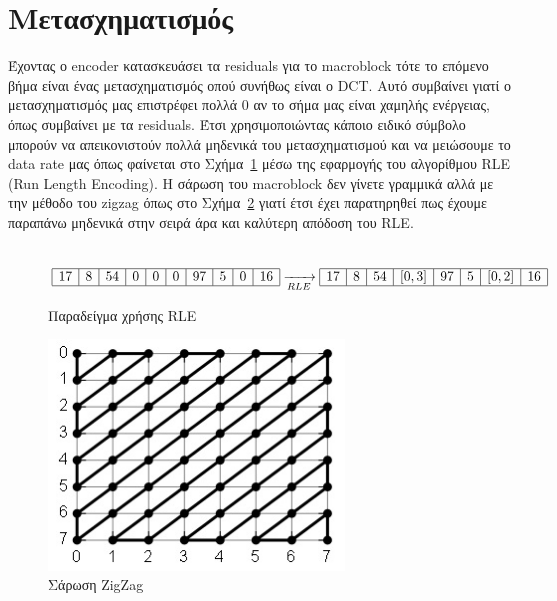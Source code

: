 \newpage

\section{Μετασχηματισμός}
\label{section:sect24}

\indent Έχοντας ο encoder κατασκευάσει τα residuals για το macroblock τότε το επόμενο βήμα είναι ένας μετασχηματισμός οπού συνήθως είναι ο DCT. Αυτό συμβαίνει γιατί ο μετασχηματισμός μας επιστρέφει πολλά 0 αν το σήμα μας είναι χαμηλής ενέργειας, όπως συμβαίνει με τα residuals. Έτσι χρησιμοποιώντας κάποιο ειδικό σύμβολο μπορούν να απεικονιστούν πολλά μηδενικά του μετασχηματισμού και να μειώσουμε το data rate μας όπως φαίνεται στο Σχήμα~\ref{eq:rle} μέσω της εφαρμογής του αλγορίθμου RLE (Run Length Encoding). Η σάρωση του macroblock δεν γίνετε γραμμικά αλλά με την μέθοδο του zigzag όπως στο Σχήμα~\ref{fig:zigzag} γιατί έτσι έχει παρατηρηθεί πως έχουμε παραπάνω μηδενικά στην σειρά άρα και καλύτερη απόδοση του RLE.
\\
\\
\begin{figure}[H]
\centering
$
\begin{array}{| c | c | c | c | c | c | c | c | c | c |}
    \hline 17 & 8 & 54 & 0 & 0 & 0 & 97 & 5 & 0 & 16 \\ \hline
\end{array}
\xrightarrow[RLE]{}
\begin{array}{| c | c | c | c | c | c | c | c |}
    \hline 17 & 8 & 54 & [0,3]  & 97 & 5 & [0,2] & 16 \\ \hline
\end{array}
$
\caption{Παραδείγμα χρήσης RLE}
\label{eq:rle}
\end{figure}

\begin{figure}[H]
  \centering
  \includegraphics[width=0.7\textwidth]{chapter2/zigzag.jpg}
  \caption{Σάρωση ZigZag}
  \label{fig:zigzag}
\end{figure}

